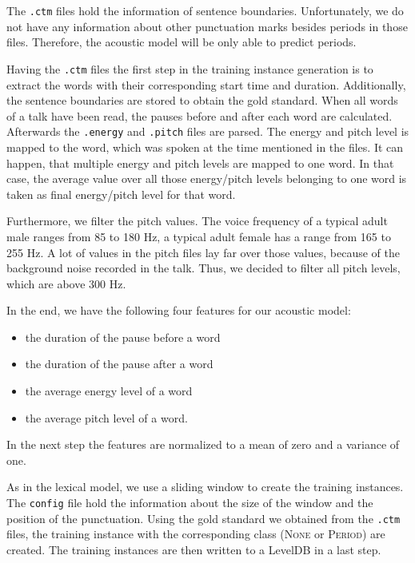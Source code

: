 The \texttt{.ctm} files hold the information of sentence boundaries.
Unfortunately, we do not have any information about other punctuation marks besides periods in those files.
Therefore, the acoustic model will be only able to predict periods.

Having the \texttt{.ctm} files the first step in the training instance generation is to extract the words with their corresponding start time and duration.
Additionally, the sentence boundaries are stored to obtain the gold standard.
When all words of a talk have been read, the pauses before and after each word are calculated.
Afterwards the \texttt{.energy} and \texttt{.pitch} files are parsed.
The energy and pitch level is mapped to the word, which was spoken at the time mentioned in the files.
It can happen, that multiple energy and pitch levels are mapped to one word.
In that case, the average value over all those energy/pitch levels belonging to one word is taken as final energy/pitch level for that word.

Furthermore, we filter the pitch values.
The voice frequency of a typical adult male ranges from 85 to 180 Hz, a typical adult female has a range from 165 to 255 Hz.
A lot of values in the pitch files lay far over those values, because of the background noise recorded in the talk.
Thus, we decided to filter all pitch levels, which are above 300 Hz.

In the end, we have the following four features for our acoustic model:
\begin{itemize}
	\item the duration of the pause before a word
	\item the duration of the pause after a word
	\item the average energy level of a word
	\item the average pitch level of a word.
\end{itemize}
In the next step the features are normalized to a mean of zero and a variance of one.

As in the lexical model, we use a sliding window to create the training instances.
The \texttt{config} file hold the information about the size of the window and the position of the punctuation.
Using the gold standard we obtained from the \texttt{.ctm} files, the training instance with the corresponding class (\textsc{None} or \textsc{Period}) are created.
The training instances are then written to a LevelDB in a last step.

